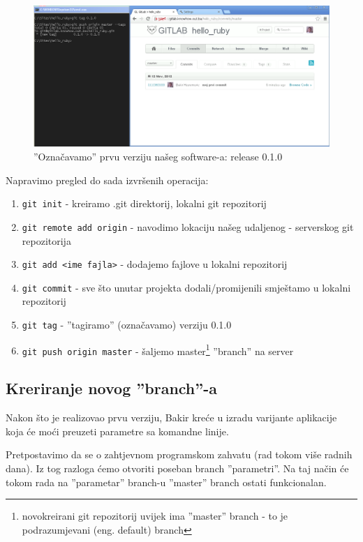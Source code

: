 \documentclass[times, utf8, seminar]{fit}
\begin{document}
\begin{figure}[H]
\centering
\includegraphics[width=15cm]{img/gitlab_tag_first_release.png}
\caption{''Označavamo'' prvu verziju našeg software-a: release 0.1.0}
\end{figure}

Napravimo pregled do sada izvršenih operacija:
\begin{enumerate}
  \item \texttt{git init} - kreiramo .git direktorij, lokalni git repozitorij
  \item \texttt{git remote add origin} - navodimo lokaciju našeg udaljenog - serverskog git repozitorija 
  \item \texttt{git add <ime fajla>} - dodajemo fajlove u lokalni repozitorij
  \item \texttt{git commit} - sve što unutar projekta dodali/promijenili smještamo u lokalni repozitorij
  \item \texttt{git tag} - ''tagiramo'' (označavamo) verziju 0.1.0
  \item \texttt{git push origin master} - šaljemo master\footnote{novokreirani git repozitorij uvijek ima ''master'' branch - to je podrazumjevani (eng. default) branch} ''branch'' na server 
\end{enumerate}

\subsection{Kreriranje novog ''branch''-a}

Nakon što je realizovao prvu verziju, Bakir kreće u izradu varijante aplikacije koja će moći preuzeti parametre sa komandne linije.

Pretpostavimo da se o zahtjevnom programskom zahvatu (rad tokom više radnih dana). Iz tog razloga ćemo otvoriti poseban branch ''parametri''.
Na taj način će tokom rada na ''parametar'' branch-u ''master'' branch ostati funkcionalan.
\end{document}
